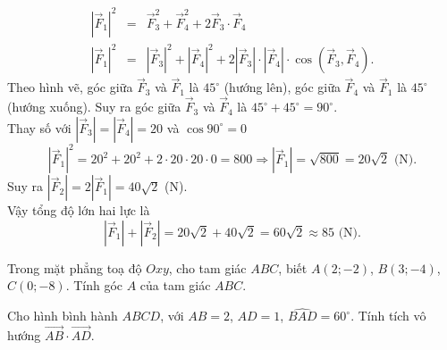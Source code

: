 \begin{ex}
{\begin{eqnarray*}
		\left|\overrightarrow{F}_1\right|^2 &=& \overrightarrow{F}_3^2 + \overrightarrow{F}_4^2 + 2\overrightarrow{F}_3 \cdot \overrightarrow{F}_4 \\
		\left|\overrightarrow{F}_1\right|^2 &=& \left|\overrightarrow{F}_3\right|^2 + \left|\overrightarrow{F}_4\right|^2 + 2\left|\overrightarrow{F}_3\right| \cdot \left|\overrightarrow{F}_4\right| \cdot \cos\left(\overrightarrow{F}_3, \overrightarrow{F}_4\right).
	\end{eqnarray*}
	Theo hình vẽ, góc giữa $\overrightarrow{F}_3$ và $\overrightarrow{F}_1$ là $45^\circ$ (hướng lên), góc giữa $\overrightarrow{F}_4$ và $\overrightarrow{F}_1$ là $45^\circ$ (hướng xuống). Suy ra góc giữa $\overrightarrow{F}_3$ và $\overrightarrow{F}_4$ là $45^\circ + 45^\circ = 90^\circ$.\\
	Thay số với $\left|\overrightarrow{F}_3\right| = \left|\overrightarrow{F}_4\right| = 20$ và $\cos 90^\circ = 0$
	$$\left|\overrightarrow{F}_1\right|^2 = 20^2 + 20^2 + 2 \cdot 20 \cdot 20 \cdot 0 = 800 \Rightarrow \left|\overrightarrow{F}_1\right| = \sqrt{800} = 20\sqrt{2}\text{ (N)}.$$
	Suy ra $\left|\overrightarrow{F}_2\right| = 2\left|\overrightarrow{F}_1\right| = 40\sqrt{2}$ (N).\\
	Vậy tổng độ lớn hai lực là
	$$\left|\overrightarrow{F}_1\right| + \left|\overrightarrow{F}_2\right| = 20\sqrt{2} + 40\sqrt{2} = 60\sqrt{2} \approx 85 \text{ (N)}.$$
	}
\end{ex}
 
\setcounter{ex}{0}
\begin{ex}%
	Trong mặt phẳng toạ độ $Oxy$, cho tam giác $ABC$, biết $A(2;-2)$, $B(3;-4)$, $C(0;-8)$. Tính góc $A$ của tam giác $ABC$.
\end{ex}
\begin{ex}%
	Cho hình bình hành $ABCD$, với $AB=2$, $AD=1$, $\widehat{BAD}=60^\circ $. Tính tích vô hướng $\overrightarrow{AB}\cdot \overrightarrow{AD}$.
\end{ex}
